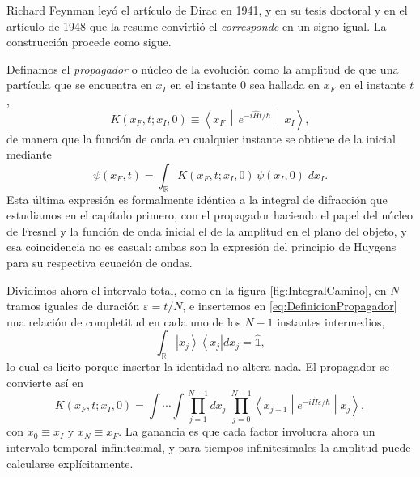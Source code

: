         Richard Feynman leyó el artículo de Dirac en 1941, y en su tesis doctoral y en el artículo de 1948 que la resume \citep{feynman1948space} convirtió el \textit{corresponde} en un signo igual. La construcción procede como sigue.

        Definamos el \textit{propagador} o núcleo de la evolución como la amplitud de que una partícula que se encuentra en $x_{I}$ en el instante $0$ sea hallada en $x_{F}$ en el instante $t$,
        \begin{equation}\label{eq:DefinicionPropagador}
            K(x_{F},t;x_{I},0) \equiv \left\langle x_{F}\,\middle|\,e^{-i\hat{H}t/\hbar}\,\middle|\,x_{I}\right\rangle,
        \end{equation}
        de manera que la función de onda en cualquier instante se obtiene de la inicial mediante
        \begin{equation}\label{eq:EvolucionPropagador}
            \psi(x_{F},t) = \int_{\mathbb{R}} K(x_{F},t;x_{I},0)\,\psi(x_{I},0)\;dx_{I} .
        \end{equation}
        Esta última expresión es formalmente idéntica a la integral de difracción que estudiamos en el capítulo primero, con el propagador haciendo el papel del núcleo de Fresnel y la función de onda inicial el de la amplitud en el plano del objeto, y esa coincidencia no es casual: ambas son la expresión del principio de Huygens para su respectiva ecuación de ondas.

        Dividimos ahora el intervalo total, como en la figura \ref{fig:IntegralCamino}, en $N$ tramos iguales de duración $\varepsilon = t/N$, e insertemos en \eqref{eq:DefinicionPropagador} una relación de completitud en cada uno de los $N-1$ instantes intermedios,
        \begin{equation}\label{eq:Completitud}
            \int_{\mathbb{R}}\left|x_{j}\right\rangle\left\langle x_{j}\right|dx_{j} = \hat{\mathbb{1}},
        \end{equation}
        lo cual es lícito porque insertar la identidad no altera nada. El propagador se convierte así en
        \begin{equation}\label{eq:PropagadorRodajas}
            K(x_{F},t;x_{I},0) = \int\cdots\int \prod_{j=1}^{N-1}dx_{j}\;\prod_{j=0}^{N-1}\left\langle x_{j+1}\middle|e^{-i\hat{H}\varepsilon/\hbar}\middle|x_{j}\right\rangle,
        \end{equation}
        con $x_{0}\equiv x_{I}$ y $x_{N}\equiv x_{F}$. La ganancia es que cada factor involucra ahora un intervalo temporal infinitesimal, y para tiempos infinitesimales la amplitud puede calcularse explícitamente.

